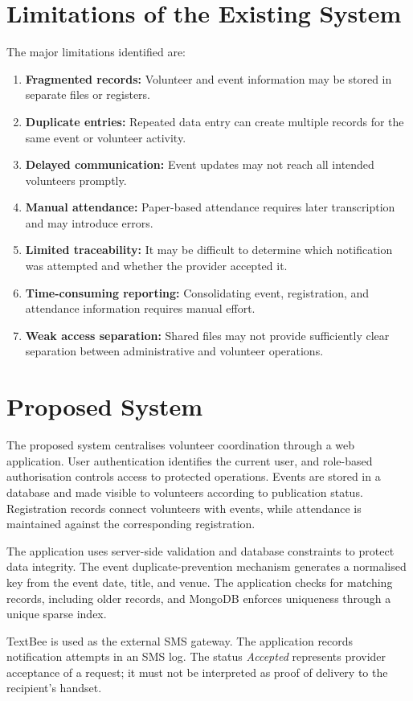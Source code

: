 \documentclass[12pt,a4paper,oneside]{report}
\begin{document}
\section{Limitations of the Existing System}
The major limitations identified are:
\begin{enumerate}[label=\arabic*.]
  \item \textbf{Fragmented records:} Volunteer and event information may be stored in separate files or registers.
  \item \textbf{Duplicate entries:} Repeated data entry can create multiple records for the same event or volunteer activity.
  \item \textbf{Delayed communication:} Event updates may not reach all intended volunteers promptly.
  \item \textbf{Manual attendance:} Paper-based attendance requires later transcription and may introduce errors.
  \item \textbf{Limited traceability:} It may be difficult to determine which notification was attempted and whether the provider accepted it.
  \item \textbf{Time-consuming reporting:} Consolidating event, registration, and attendance information requires manual effort.
  \item \textbf{Weak access separation:} Shared files may not provide sufficiently clear separation between administrative and volunteer operations.
\end{enumerate}

\section{Proposed System}
The proposed system centralises volunteer coordination through a web application. User authentication identifies the current user, and role-based authorisation controls access to protected operations. Events are stored in a database and made visible to volunteers according to publication status. Registration records connect volunteers with events, while attendance is maintained against the corresponding registration.

The application uses server-side validation and database constraints to protect data integrity. The event duplicate-prevention mechanism generates a normalised key from the event date, title, and venue. The application checks for matching records, including older records, and MongoDB enforces uniqueness through a unique sparse index.

TextBee is used as the external SMS gateway. The application records notification attempts in an SMS log. The status \textit{Accepted} represents provider acceptance of a request; it must not be interpreted as proof of delivery to the recipient's handset.
\end{document}
